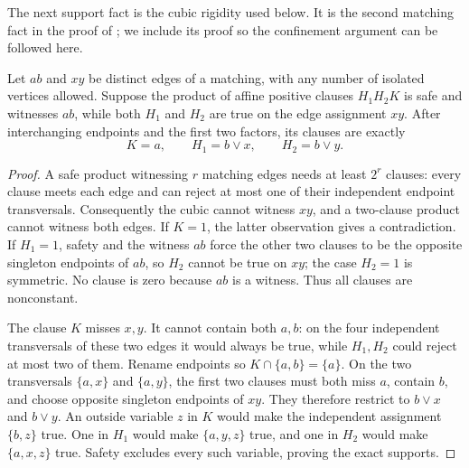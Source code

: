 The next support fact is the cubic rigidity used below. It is the second
matching fact in the proof of \citet[Lemma~5.26]{Companion}; we include
its proof so the confinement argument can be followed here.
\begin{lemma}\label{lem:cubicrigidity}
Let $ab$ and $xy$ be distinct edges of a matching, with any number of
isolated vertices allowed. Suppose the product of affine positive
clauses $H_1H_2K$ is safe and witnesses $ab$, while both $H_1$ and $H_2$
are true on the edge assignment $xy$. After interchanging endpoints and
the first two factors, its clauses are exactly
\[
 K=a,\qquad H_1=b\vee x,\qquad H_2=b\vee y.
\]
\end{lemma}
\begin{proof}
A safe product witnessing $r$ matching edges needs at least $2^r$
clauses: every clause meets each edge and can reject at most one of
their independent endpoint transversals. Consequently the cubic cannot
witness $xy$, and a two-clause product cannot witness both edges.
If $K=1$, the latter observation gives a contradiction. If $H_1=1$,
safety and the witness $ab$ force the other two clauses to be the
opposite singleton endpoints of $ab$, so $H_2$ cannot be true on $xy$;
the case $H_2=1$ is symmetric. No clause is zero because $ab$ is a
witness. Thus all clauses are nonconstant.

The clause $K$ misses $x,y$. It cannot contain both $a,b$: on the four
independent transversals of these two edges it would always be true,
while $H_1,H_2$ could reject at most two of them. Rename endpoints so
$K\cap\{a,b\}=\{a\}$. On the two transversals $\{a,x\}$ and
$\{a,y\}$, the first two clauses must both miss $a$, contain $b$, and
choose opposite singleton endpoints of $xy$. They therefore restrict
to $b\vee x$ and $b\vee y$. An outside variable $z$ in $K$ would make
the independent assignment $\{b,z\}$ true. One in $H_1$ would make
$\{a,y,z\}$ true, and one in $H_2$ would make $\{a,x,z\}$ true.
Safety excludes every such variable, proving the exact supports.
\end{proof}

